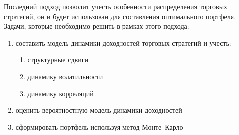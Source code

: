 Последний подход позволит учесть особенности распределения торговых стратегий, он и будет использован для составления оптимального портфеля. Задачи, которые необходимо решить в рамках этого подхода:
\begin{enumerate}
	\item составить модель динамики доходностей торговых стратегий и учесть:
	\begin{enumerate}
		\item структурные сдвиги
		\item динамику волатильности
		\item динамику корреляций
	\end{enumerate}
	\item оценить вероятностную модель динамики доходностей
	\item сформировать портфель  используя метод Монте--Карло
\end{enumerate}